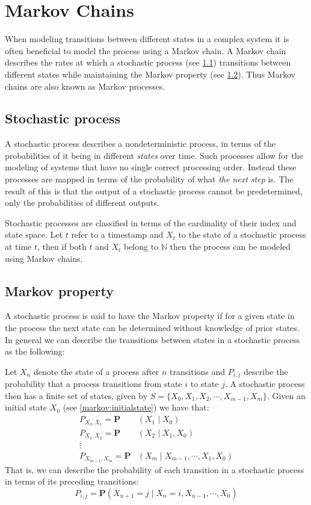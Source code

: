 \section{Markov Chains}\label{markov}
When modeling transitions between different states in a complex system it is often beneficial to model the process using a Markov chain.
A Markov chain describes the rates at which a stochastic process (see \cref{markov:stochastic}) transitions between different states while maintaining the Markov property (see \cref{markov:property}).
Thus Markov chains are also known as Markov processes.

\subsection{Stochastic process}\label{markov:stochastic}
A stochastic process describes a nondeterministic process, in terms of the probabilities of it being in different \emph{states} over time.
Such processes allow for the modeling of systems that have no single correct processing order.
Instead these processes are mapped in terms of the probability of what \emph{the next step} is.
The result of this is that the output of a stochastic process cannot be predetermined, only the probabilities of different outputs.

Stochastic processes are classified in terms of the cardinality of their index and state space.
Let $t$ refer to a timestamp and $X_t$ to the state of a stochastic process at time $t$, then if both $t$ and $X_t$ belong to $\mathbb{N}$ then the process can be modeled using Markov chains.

\subsection{Markov property}\label{markov:property}
A stochastic process is said to have the Markov property if for a given state in the process the next state can be determined without knowledge of prior states.
In general we can describe the transitions between states in a stochastic process as the following:

Let $X_n$ denote the state of a process after $n$ transitions and $P_{i,j}$ describe the probability that a process transitions from state $i$ to state $j$.
A stochastic process then has a finite set of states, given by $S = \{X_0, X_1, X_2,\cdots, X_{m-1}, X_m\}$.
Given an initial state $X_0$ (see \cref{markov:initialstate}) we have that:
\begin{align*}
P_{X_0,X_1} = \mathbf{P}&(X_1 \mid X_0)\\
P_{X_1,X_2} = \mathbf{P}&(X_2 \mid X_1, X_0)\\
\vdots\\
P_{X_{m-1},X_m} = \mathbf{P}&(X_m \mid X_{m-1}, \cdots, X_1, X_0)
\end{align*}
That is, we can describe the probability of each transition in a stochastic process in terms of its preceding transitions:
\begin{equation}\label{markov:eq:stochastic_prob}
P_{i,j} = \mathbf{P}(X_{n+1} = j \mid X_n = i, X_{n-1}, \cdots, X_0)
\end{equation}

